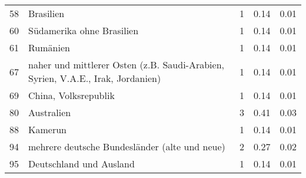 \begin{longtable}{lXrrr}
        58 & \multicolumn{1}{X}{Brasilien} & %
          \num{1} &
          \num[round-mode=places,round-precision=2]{0,14} &
          \num[round-mode=places,round-precision=2]{0,01} \\

        60 & \multicolumn{1}{X}{Südamerika ohne Brasilien} & %
          \num{1} &
          \num[round-mode=places,round-precision=2]{0,14} &
          \num[round-mode=places,round-precision=2]{0,01} \\

        61 & \multicolumn{1}{X}{Rumänien} & %
          \num{1} &
          \num[round-mode=places,round-precision=2]{0,14} &
          \num[round-mode=places,round-precision=2]{0,01} \\

        67 & \multicolumn{1}{X}{naher und mittlerer Osten (z.B. Saudi-Arabien, Syrien, V.A.E., Irak, Jordanien)} & %
          \num{1} &
          \num[round-mode=places,round-precision=2]{0,14} &
          \num[round-mode=places,round-precision=2]{0,01} \\

        69 & \multicolumn{1}{X}{China, Volksrepublik} & %
          \num{1} &
          \num[round-mode=places,round-precision=2]{0,14} &
          \num[round-mode=places,round-precision=2]{0,01} \\

        80 & \multicolumn{1}{X}{Australien} & %
          \num{3} &
          \num[round-mode=places,round-precision=2]{0,41} &
          \num[round-mode=places,round-precision=2]{0,03} \\

        88 & \multicolumn{1}{X}{Kamerun} & %
          \num{1} &
          \num[round-mode=places,round-precision=2]{0,14} &
          \num[round-mode=places,round-precision=2]{0,01} \\

        94 & \multicolumn{1}{X}{mehrere deutsche Bundesländer (alte und neue)} & %
          \num{2} &
          \num[round-mode=places,round-precision=2]{0,27} &
          \num[round-mode=places,round-precision=2]{0,02} \\

        95 & \multicolumn{1}{X}{Deutschland und Ausland} & %
          \num{1} &
          \num[round-mode=places,round-precision=2]{0,14} &
          \num[round-mode=places,round-precision=2]{0,01} \\


\end{longtable}
